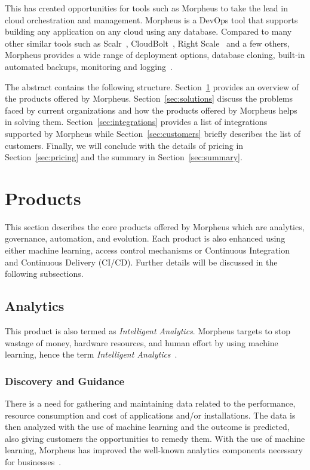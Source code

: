 This has created opportunities for tools such as Morpheus to take the lead in 
cloud orchestration and management. Morpheus is a DevOps tool that supports 
building any application on any cloud using any database. Compared to many 
other similar tools such as Scalr~\cite{hid-sp18-416-www-scalr}, 
CloudBolt~\cite{hid-sp18-416-www-cloudbolt}, Right 
Scale~\cite{hid-sp18-416-www-rightscale} and a few others, Morpheus provides a 
wide range of deployment options, database cloning, built-in automated backups, 
monitoring and 
logging~\cite{hid-sp18-416-www-cloud-management-tools-comparison}.

The abstract contains the following structure. Section~\ref{sec:products} 
provides an overview of the products offered by Morpheus. 
Section~\ref{sec:solutions} discuss the problems faced by current organizations 
and how the products offered by Morpheus helps in solving them. 
Section~\ref{sec:integrations} provides a list of integrations supported by 
Morpheus while Section~\ref{sec:customers} briefly describes the list of 
customers. Finally, we will conclude with the details of pricing 
in Section~\ref{sec:pricing} and the summary in Section~\ref{sec:summary}.

\section{Products}
\label{sec:products}
This section describes the core products offered by Morpheus which are 
analytics, governance, automation, and evolution. Each product is also enhanced 
using either machine learning, access control mechanisms or Continuous 
Integration and Continuous Delivery (CI/CD). Further details will be discussed 
in the following subsections.

\subsection{Analytics}

This product is also termed as \textit{Intelligent Analytics}. Morpheus targets 
to stop wastage of money, hardware resources, and human effort by using machine 
learning, hence the term \textit{Intelligent 
Analytics}~\cite{hid-sp18-416-www-morpheus-product-guide}.  

\subsubsection{Discovery and Guidance}

There is a need for gathering and maintaining data related to the performance, 
resource consumption and cost of applications and/or installations. The data is 
then analyzed with the use of machine learning and the outcome is predicted, 
also giving customers the opportunities to remedy them. With the use of machine 
learning, Morpheus has improved the well-known analytics components necessary 
for businesses~\cite{hid-sp18-416-www-morpheus-analytics}. 


